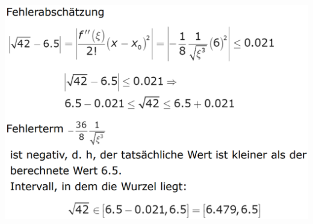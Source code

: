 \documentclass[12pt,a4paper]{article}
\begin{document}
\includegraphics[width=1\textwidth]{Bilder/V1/20.png}\\
\end{document}
